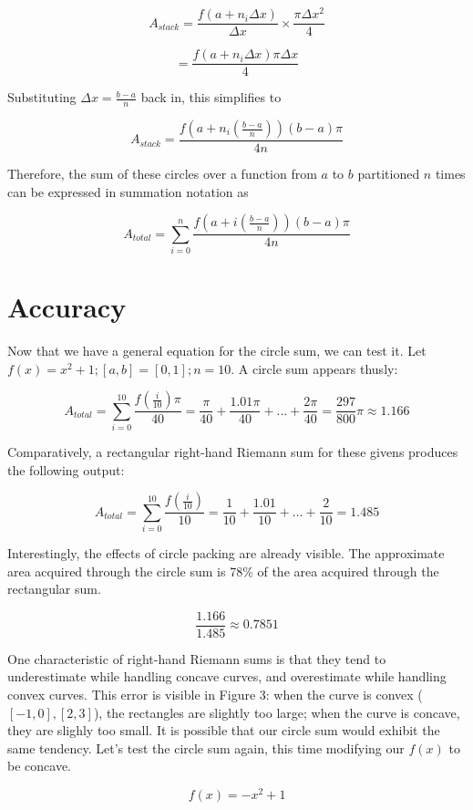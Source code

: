 \documentclass{article}
\begin{document}
        \[ A_{stack} = \frac{f(a+n_i\Delta x)}{\Delta x} \times \frac{\pi \Delta x^2}{4} \]

        \[ = \frac{f(a+n_i\Delta x)\pi\Delta x}{4} \]

        Substituting \( \Delta x = \frac{b-a}{n} \) back in, this simplifies to

        \[ A_{stack} = \frac{f(a+n_i(\frac{b-a}{n}))(b-a)\pi}{4n} \]

        Therefore, the sum of these circles over a function from \( a \) to \( b \) partitioned \( n \) times can be expressed in summation notation as

        \[ A_{total} = \displaystyle \sum_{i=0}^n \frac{f(a+i(\frac{b-a}{n}))(b-a)\pi}{4n} \]

  \section{Accuracy}
    Now that we have a general equation for the circle sum, we can test it. Let \( f(x) = x^2 + 1; [a,b] = [0,1]; n = 10 \). A circle sum appears thusly:

    \[ A_{total} = \displaystyle \sum_{i=0}^{10} \frac{f(\frac{i}{10})\pi}{40} = \frac{\pi}{40} + \frac{1.01\pi}{40} + \dots + \frac{2\pi}{40} = \frac{297}{800}\pi \approx 1.166 \]

    Comparatively, a rectangular right-hand Riemann sum for these givens produces the following output:

    \[ A_{total} = \displaystyle \sum_{i=0}^{10} \frac{f(\frac{i}{10})}{10} = \frac{1}{10} + \frac{1.01}{10} + \dots + \frac{2}{10} = 1.485 \]

    Interestingly, the effects of circle packing are already visible. The approximate area acquired through the circle sum is 78\% of the area acquired through the rectangular sum.

    \[ \frac{1.166}{1.485} \approx 0.7851 \]

    One characteristic of right-hand Riemann sums is that they tend to underestimate while handling concave curves, and overestimate while handling convex curves. This error is visible in Figure 3: when the curve is convex (\([-1,0],[2,3] \)), the rectangles are slightly too large; when the curve is concave, they are slighly too small. It is possible that our circle sum would exhibit the same tendency. Let's test the circle sum again, this time modifying our \( f(x) \) to be concave.

    \[ f(x) = -x^2 + 1 \]
\end{document}
